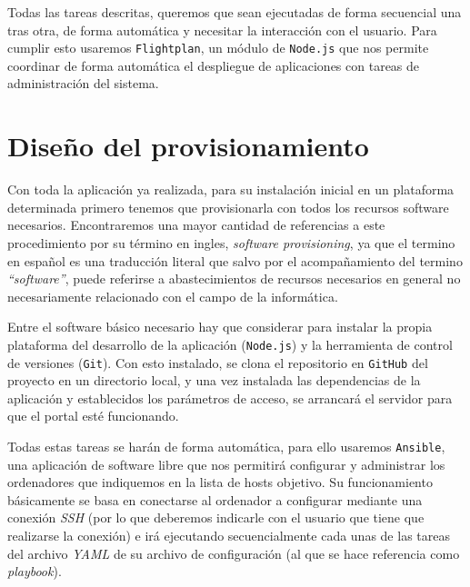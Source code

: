 \bigskip
Todas las tareas descritas, queremos que sean ejecutadas de forma secuencial una tras otra, de forma automática y necesitar la interacción con el usuario. Para cumplir esto usaremos {\tt Flightplan}, un módulo de {\tt Node.js} que nos permite coordinar de forma automática el despliegue de aplicaciones con tareas de administración del sistema.

\newpage
\section{Diseño del provisionamiento}

Con toda la aplicación ya realizada, para su instalación inicial en un plataforma determinada primero tenemos que provisionarla con todos los recursos software necesarios. Encontraremos una mayor cantidad de referencias a este procedimiento por su término en ingles, \textit{software provisioning}, ya que el termino en español es una traducción literal que salvo por el acompañamiento del termino \textit{``software''}, puede referirse a abastecimientos de recursos necesarios en general no necesariamente relacionado con el campo de la informática.

\bigskip
Entre el software básico necesario hay que considerar para instalar la propia plataforma del desarrollo de la aplicación ({\tt Node.js}) y la herramienta de control de versiones ({\tt Git}). Con esto instalado, se clona el repositorio en {\tt GitHub} del proyecto en un directorio local, y una vez instalada las dependencias de la aplicación y establecidos los parámetros de acceso, se arrancará el servidor para que el portal esté funcionando.

\bigskip
Todas estas tareas se harán de forma automática, para ello usaremos {\tt Ansible}, una aplicación de software libre que nos permitirá configurar y administrar los ordenadores que indiquemos en la lista de hosts objetivo. Su funcionamiento básicamente se basa en conectarse al ordenador a configurar mediante una conexión \textit{SSH} (por lo que deberemos indicarle con el usuario que tiene que realizarse la conexión) e irá ejecutando secuencialmente cada unas de las tareas del archivo \textit{YAML} de su archivo de configuración (al que se hace referencia como \textit{playbook}).